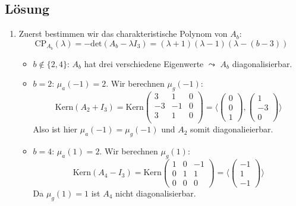 \subsection{Lösung}
\begin{enumerate}
	\item Zuerst bestimmen wir das charakteristische Polynom von \( A_b \):
	\begin{equation*}
	 	\text{CP}_{A_b}(\lambda) = -\text{det}(A_b - \lambda I_3) = (\lambda + 1)(\lambda - 1)(\lambda - (b-3))
	 \end{equation*} 
	 \begin{itemize}
	 	\item \( b \not \in \{ 2, 4 \} \): \( A_b \) hat drei verschiedene Eigenwerte \( \leadsto \) \( A_b \) diagonalisierbar.
	 	\item \( b = 2 \): \( \mu_a(-1) = 2 \). Wir berechnen \( \mu_g(-1) \):
	 	\begin{equation*}
	 	 	\text{Kern}(A_2 + I_3) = \text{Kern}\begin{pmatrix}
	 	 		3 & 1 & 0 \\
	 	 		-3 & -1 & 0 \\
	 	 		3 & 1 & 0 \\
	 	 	\end{pmatrix} = \langle \begin{pmatrix}
	 	 		0 \\ 0 \\ 1
	 	 	\end{pmatrix}, \begin{pmatrix}
	 	 		1 \\ -3 \\ 0
	 	 	\end{pmatrix} \rangle
	 	 \end{equation*} 
	 	 Also ist hier \( \mu_a(-1) = \mu_g(-1) \) und \( A_2 \) somit diagonalieierbar.

	 	 \item \( b = 4 \): \( \mu_a(1) = 2 \). Wir berechnen \( \mu_g(1) \):
	 	 \begin{equation*}
	 	 	\text{Kern}(A_4-I_3) = \text{Kern}\begin{pmatrix}
	 	 		1 & 0 & -1 \\
	 	 		0 & 1 & 1 \\
	 	 		0 & 0 & 0 
	 	 	\end{pmatrix} = \langle \begin{pmatrix}
	 	 		-1 \\ 1 \\ -1
	 	 	\end{pmatrix} \rangle
	 	 \end{equation*}
	 	 Da \( \mu_g(1) = 1 \) ist \( A_4 \) nicht diagonalisierbar.
	 \end{itemize}


\end{enumerate}
